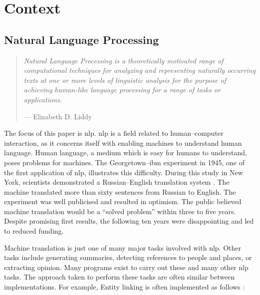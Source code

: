 \chapter{Context}\label{context}

\glsresetall

\section{Natural Language Processing}\label{natural-language-processing}

\begin{quote}
  \textit{Natural Language Processing is a theoretically motivated range
    of computational techniques for analyzing and representing
    naturally occurring texts at one or more levels of linguistic
    analysis for the purpose of achieving human-like language processing
    for a range of tasks or applications.
  }

  \medskip
  --- Elizabeth D. Liddy \autocite*{natural-language-processing-liddy-2001}
\end{quote}

\noindent The focus of this paper is \gls{nlp}.
\gls{nlp} is a field related to human--computer interaction, as it
  concerns itself with enabling machines to understand human language.
Human language, a medium which is easy for humans to understand, poses
  problems for machines.
The Georgetown--\gls{ibm} experiment in 1945, one of the first application
  of \gls{nlp}, illustrates this difficulty.
During this study in New York, scientists demonstrated a
  Russian--English translation system
  \autocite{hutchins-john-georgetown-ibm-system}.
The machine translated more than sixty sentences from Russian to English.
The experiment was well publicised and resulted in optimism.
The public believed machine translation would be a ``solved problem'' within
  three to five years.
Despite promising first results, the following ten years were disappointing
  and led to reduced funding.

Machine translation is just one of many major tasks involved with \gls{nlp}.
Other tasks include generating summaries, detecting references to people
  and places, or extracting opinion.
Many programs exist to carry out these and many other \gls{nlp} tasks.
The approach taken to perform these tasks are often similar between
  implementations.
For example, Entity linking is often implemented as follows
  \autocite[according to][]{stanbol-enhancer-nlp}:

